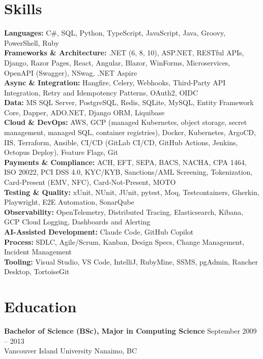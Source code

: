 \documentclass[10.5pt]{article}
\begin{document}
\section*{Skills}
\textbf{\color{accentlight}Languages:} C\#, SQL, Python, TypeScript, JavaScript, Java, Groovy, PowerShell, Ruby \\
\textbf{\color{accentlight}Frameworks \& Architecture:} .NET (6, 8, 10), ASP.NET, RESTful APIs, Django, Razor Pages, React, Angular, Blazor, WinForms, Microservices, OpenAPI (Swagger), NSwag, .NET Aspire \\
\textbf{\color{accentlight}Async \& Integration:} Hangfire, Celery, Webhooks, Third-Party API Integration, Retry and Idempotency Patterns, OAuth2, OIDC \\
\textbf{\color{accentlight}Data:} MS SQL Server, PostgreSQL, Redis, SQLite, MySQL, Entity Framework Core, Dapper, ADO.NET, Django ORM, Liquibase \\
\textbf{\color{accentlight}Cloud \& DevOps:} AWS, GCP (managed Kubernetes, object storage, secret management, managed SQL, container registries), Docker, Kubernetes, ArgoCD, IIS, Terraform, Ansible, CI/CD (GitLab CI/CD, GitHub Actions, Jenkins, Octopus Deploy), Feature Flags, Git \\
\textbf{\color{accentlight}Payments \& Compliance:} ACH, EFT, SEPA, BACS, NACHA, CPA 1464, ISO 20022, PCI DSS 4.0, KYC/KYB, Sanctions/AML Screening, Tokenization, Card-Present (EMV, NFC), Card-Not-Present, MOTO \\
\textbf{\color{accentlight}Testing \& Quality:} xUnit, NUnit, JUnit, pytest, Moq, Testcontainers, Gherkin, Playwright, E2E Automation, SonarQube \\
\textbf{\color{accentlight}Observability:} OpenTelemetry, Distributed Tracing, Elasticsearch, Kibana, GCP Cloud Logging, Dashboards and Alerting \\
\textbf{\color{accentlight}AI-Assisted Development:} Claude Code, GitHub Copilot \\
\textbf{\color{accentlight}Process:} SDLC, Agile/Scrum, Kanban, Design Specs, Change Management, Incident Management \\
\textbf{\color{accentlight}Tooling:} Visual Studio, VS Code, IntelliJ, RubyMine, SSMS, pgAdmin, Rancher Desktop, TortoiseGit

\section*{Education}
\textbf{Bachelor of Science (BSc), Major in Computing Science} \hfill {\color{textgray!80} September 2009 -- 2013}\\
{\color{textgray!80} Vancouver Island University \hfill Nanaimo, BC}\\
\end{document}
